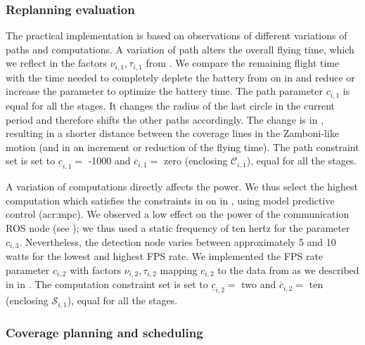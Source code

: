 \subsubsection*{Replanning evaluation}

The practical implementation is based on observations of different variations of paths and computations. A variation of path alters the overall flying time, which we reflect in the factors $\nu_{i,1},\tau_{i,1}$ from . We compare the remaining flight time with the time needed to completely deplete the battery from  on  in  and reduce or increase the parameter to optimize the battery time. The path parameter $c_{i,1}$ is equal for all the stages. It changes the radius of the last circle in the current period and therefore shifts the other paths accordingly. The change is in , resulting in a shorter distance between the coverage lines in the Zamboni-like motion (and in an increment or reduction of the flying time). The path constraint set is set to $\underline{c}_{i,1}=$ -1000 and $\overline{c}_{i,1}=$ zero (enclosing $\mathcal{C}_{i,1}$), equal for all the stages.

A variation of computations directly affects the power. We thus select the highest computation which satisfies the constraints in  on  in , using model predictive control (\Gls{acr:mpc}). We observed a low effect on the power of the communication ROS node (see ); we thus used a static frequency of ten hertz for the parameter $c_{i,3}$. Nevertheless, the detection node varies between approximately 5 and 10 watts for the lowest and highest FPS rate. We implemented the FPS rate parameter $c_{i,2}$ with factors  $\nu_{i,2},\tau_{i,2}$ mapping $c_{i,2}$ to the data from \powprof{} as we described in  in . The computation constraint set is set to $\underline{c}_{i,2}=$ two and $\overline{c}_{i,2}=$ ten (enclosing $\mathcal{S}_{i,1}$), equal for all the stages.

\subsubsection*{Coverage planning and scheduling}

